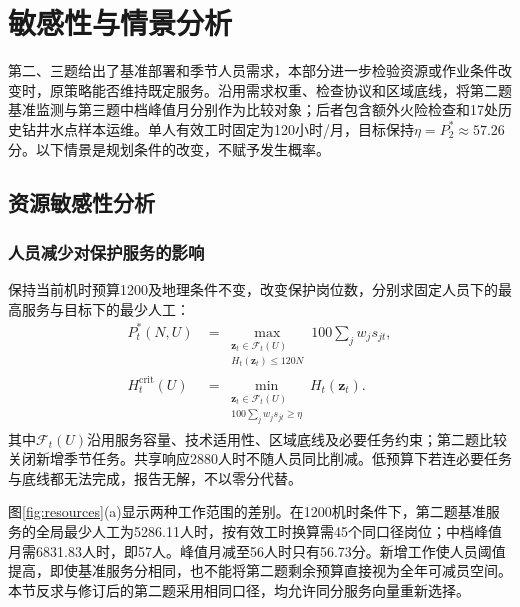 \documentclass[UTF8,fontset=fandol,12pt,a4paper]{ctexart}
\begin{document}
\section{敏感性与情景分析}

第二、三题给出了基准部署和季节人员需求，本部分进一步检验资源或作业条件改变时，原策略能否维持既定服务。沿用需求权重、检查协议和区域底线，将第二题基准监测与第三题中档峰值月分别作为比较对象；后者包含额外火险检查和17处历史钻井水点样本运维。单人有效工时固定为120小时/月，目标保持\(\eta=P_2^*\approx57.26\)分。以下情景是规划条件的改变，不赋予发生概率。

\subsection{资源敏感性分析}

\subsubsection{人员减少对保护服务的影响}

保持当前机时预算1200及地理条件不变，改变保护岗位数，分别求固定人员下的最高服务与目标下的最少人工：
\begin{equation}
\begin{aligned}
P_t^*(N,U)&=\max_{\substack{\mathbf z_t\in\mathcal F_t(U)\\H_t(\mathbf z_t)\le120N}}100\sum_jw_js_{jt},\\
H_t^{\mathrm{crit}}(U)&=\min_{\substack{\mathbf z_t\in\mathcal F_t(U)\\100\sum_jw_js_{jt}\ge\eta}}H_t(\mathbf z_t).
\end{aligned}
\label{eq:resource}
\end{equation}
其中\(\mathcal F_t(U)\)沿用服务容量、技术适用性、区域底线及必要任务约束；第二题比较关闭新增季节任务。共享响应2880人时不随人员同比削减。低预算下若连必要任务与底线都无法完成，报告无解，不以零分代替。

图\ref{fig:resources}(a)显示两种工作范围的差别。在1200机时条件下，第二题基准服务的全局最少人工为5286.11人时，按有效工时换算需45个同口径岗位；中档峰值月需6831.83人时，即57人。峰值月减至56人时只有56.73分。新增工作使人员阈值提高，即使基准服务分相同，也不能将第二题剩余预算直接视为全年可减员空间。本节反求与修订后的第二题采用相同口径，均允许同分服务向量重新选择。
\end{document}
